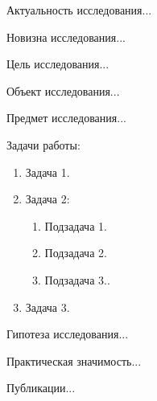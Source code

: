 \documentclass[../main.tex]{subfiles}
\begin{document}
	
	Актуальность исследования...  
	
    Новизна исследования...

	Цель исследования...
	
	Объект исследования...
	
	Предмет исследования...
	
	Задачи работы:
	\begin{enumerate}[leftmargin=*]
		\item Задача 1.
		\item Задача 2:
		\begin{enumerate}
    		\item Подзадача 1.
    		\item Подзадача 2.
    		\item Подзадача 3..
		\end{enumerate}
		\item Задача 3.
	\end{enumerate}

    Гипотеза исследования...

	Практическая значимость...
		
	Публикации...
\end{document}
